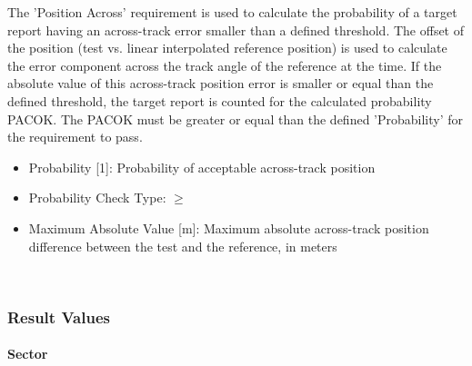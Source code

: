 The 'Position Across' requirement is used to calculate the probability of a target report having an across-track error smaller than a defined threshold. The offset of the position (test vs. linear interpolated reference position) is used to calculate the error component across the track angle of the reference at the time. If the absolute value of this across-track position error is smaller or equal than the defined threshold, the target report is counted for the calculated probability PACOK. The PACOK must be greater or equal than the defined 'Probability' for the requirement to pass. \\

\begin{itemize}  
\item Probability [1]: Probability of acceptable across-track position
\item Probability Check Type: $\geq$
\item Maximum Absolute Value [m]: Maximum absolute across-track position difference between the test and the reference, in meters
\end{itemize}
\ \\

\subsubsection{Result Values}

\paragraph{Sector}

